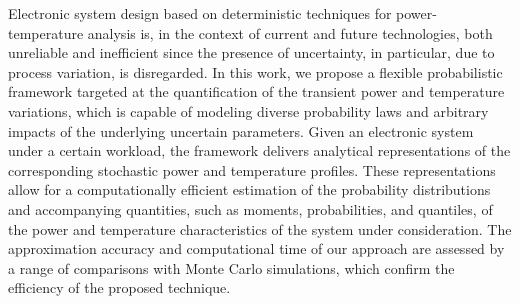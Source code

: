 Electronic system design based on deterministic techniques for power-temperature analysis is, in the context of current and future technologies, both unreliable and inefficient since the presence of uncertainty, in particular, due to process variation, is disregarded.
In this work, we propose a flexible probabilistic framework targeted at the quantification of the transient power and temperature variations, which is capable of modeling diverse probability laws and arbitrary impacts of the underlying uncertain parameters.
Given an electronic system under a certain workload, the framework delivers analytical representations of the corresponding stochastic power and temperature profiles.
These representations allow for a computationally efficient estimation of the probability distributions and accompanying quantities, such as moments, probabilities, and quantiles, of the power and temperature characteristics of the system under consideration.
The approximation accuracy and computational time of our approach are assessed by a range of comparisons with Monte Carlo simulations, which confirm the efficiency of the proposed technique.
